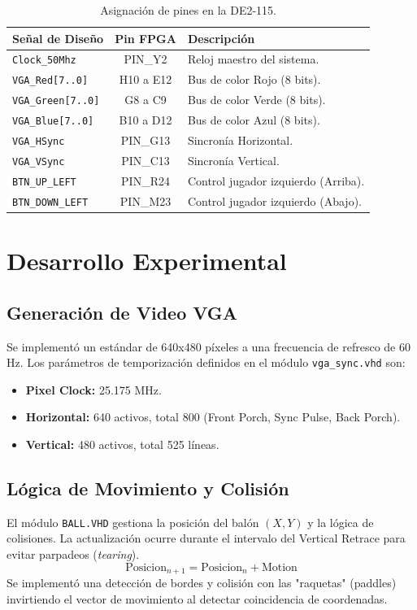 \documentclass[12pt, a4paper]{article}
\begin{document}
\begin{table}[h]
    \centering
    \begin{tabular}{|l|c|l|}
        \hline
        \textbf{Señal de Diseño} & \textbf{Pin FPGA} & \textbf{Descripción} \\ \hline
        \texttt{Clock\_50Mhz} & PIN\_Y2 & Reloj maestro del sistema. \\ \hline
        \texttt{VGA\_Red[7..0]} & H10 a E12 & Bus de color Rojo (8 bits). \\ \hline
        \texttt{VGA\_Green[7..0]} & G8 a C9 & Bus de color Verde (8 bits). \\ \hline
        \texttt{VGA\_Blue[7..0]} & B10 a D12 & Bus de color Azul (8 bits). \\ \hline
        \texttt{VGA\_HSync} & PIN\_G13 & Sincronía Horizontal. \\ \hline
        \texttt{VGA\_VSync} & PIN\_C13 & Sincronía Vertical. \\ \hline
        \texttt{BTN\_UP\_LEFT} & PIN\_R24 & Control jugador izquierdo (Arriba). \\ \hline
        \texttt{BTN\_DOWN_LEFT} & PIN\_M23 & Control jugador izquierdo (Abajo). \\ \hline
    \end{tabular}
    \caption{Asignación de pines en la DE2-115.}
\end{table}

\section{Desarrollo Experimental}

\subsection{Generación de Video VGA}
Se implementó un estándar de 640x480 píxeles a una frecuencia de refresco de 60\,Hz. Los parámetros de temporización definidos en el módulo \texttt{vga\_sync.vhd} son:
\begin{itemize}
    \item \textbf{Pixel Clock:} 25.175 MHz.
    \item \textbf{Horizontal:} 640 activos, total 800 (Front Porch, Sync Pulse, Back Porch).
    \item \textbf{Vertical:} 480 activos, total 525 líneas.
\end{itemize}

\subsection{Lógica de Movimiento y Colisión}
El módulo \texttt{BALL.VHD} gestiona la posición del balón $(X, Y)$ y la lógica de colisiones. La actualización ocurre durante el intervalo del Vertical Retrace para evitar parpadeos (\textit{tearing}).
\begin{equation}
    \text{Posicion}_{n+1} = \text{Posicion}_{n} + \text{Motion}
\end{equation}
Se implementó una detección de bordes y colisión con las "raquetas" (paddles) invirtiendo el vector de movimiento al detectar coincidencia de coordenadas.
\end{document}
